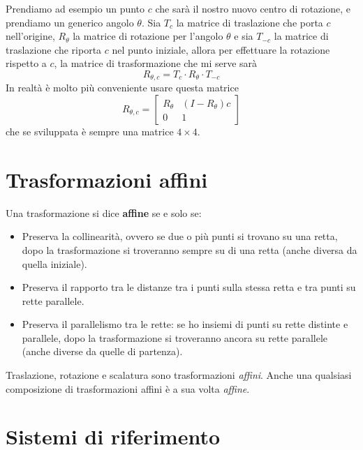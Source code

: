 Prendiamo ad esempio un punto $c$ che sar\`a il nostro nuovo centro di rotazione, e prendiamo
un generico angolo $\theta$. Sia $T_c$ la matrice di traslazione che porta $c$ nell'origine,
$R_\theta$ la matrice di rotazione per l'angolo $\theta$ e sia $T_{-c}$ la matrice di
traslazione che riporta $c$ nel punto iniziale, allora per effettuare la rotazione rispetto
a $c$, la matrice di trasformazione che mi serve sar\`a
\[ R_{\theta, c} = T_c \cdot R_\theta \cdot T_{-c} \]
In realt\`a \`e molto pi\`u conveniente usare questa matrice
\[
	R_{\theta, c} = \begin{bmatrix}
		R_\theta & (I - R_\theta) c \\
		0        & 1
	\end{bmatrix}
\]
che se sviluppata \`e sempre una matrice $4 \times 4$.

\section{Trasformazioni affini}
Una trasformazione si dice \textbf{affine} se e solo se:
\begin{itemize}
	\item Preserva la collinearit\`a, ovvero se due o pi\`u punti si trovano su una retta,
	      dopo la trasformazione si troveranno sempre su di una retta (anche diversa da
	      quella iniziale).
	\item Preserva il rapporto tra le distanze tra i punti sulla stessa retta e tra punti su
	      rette parallele.
	\item Preserva il parallelismo tra le rette: se ho insiemi di punti su rette distinte e
	      parallele, dopo la trasformazione si troveranno ancora su rette parallele (anche
	      diverse da quelle di partenza).
\end{itemize}
Traslazione, rotazione e scalatura sono trasformazioni \emph{affini}. Anche una qualsiasi
composizione di trasformazioni affini \`e a sua volta \emph{affine}.

\section{Sistemi di riferimento}
